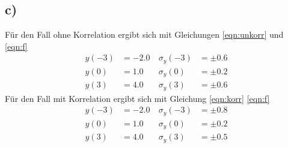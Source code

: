 \subsection{c)}
\label{subsec:a4c}
Für den Fall ohne Korrelation ergibt sich
mit Gleichungen \ref{eqn:unkorr} und \ref{eqn:f}
\\
\begin{align*}
  y(-3) &= \SI{-2.0}{} &\sigma_{y}(-3) &= \pm 0.6\\
  y(0) &= \SI{1.0}{}   &\sigma_{y}(0) &= \pm0.2\\
  y(3) &= \SI{4.0}{}   &\sigma_{y}(3) &= \pm0.6
\end{align*}
Für den Fall mit Korrelation ergibt sich mit
Gleichung \ref{eqn:korr} \ref{eqn:f}
\\
\begin{align*}
  y(-3) &= \SI{-2.0}{}   &\sigma_{y}(-3)&= \pm0.8\\
  y(0) &= \SI{1.0}{}     &\sigma_{y}(0) &= \pm0.2\\
  y(3) &= \SI{4.0}{}     &\sigma_{y}(3) &= \pm0.5
\end{align*}
